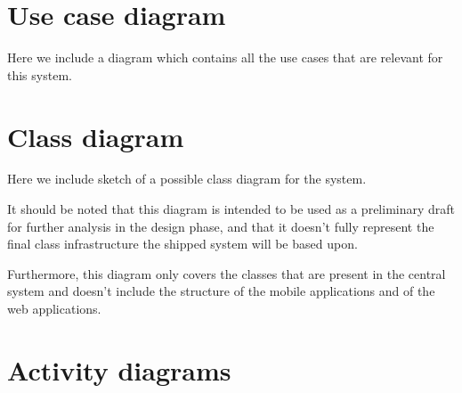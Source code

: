 \section{Use case diagram}
Here we include a diagram which contains all the use cases that are relevant for this system.
\begin{landscape}

\end{landscape}


\section{Class diagram}
Here we include sketch of a possible class diagram for the system. 

It should be noted that this diagram is intended to be used as a preliminary draft for further analysis in the design phase, and that it doesn't fully represent the final class infrastructure the shipped system will be based upon.

Furthermore, this diagram only covers the classes that are present in the central system and doesn't include the structure of the mobile applications and of the web applications.

\begin{landscape}
%

\end{landscape}


\section{Activity diagrams}
